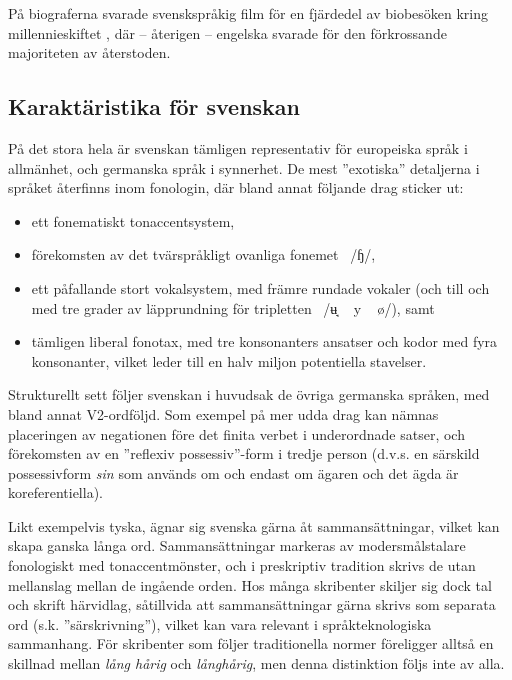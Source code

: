 \begin{multicols}{2}
På biograferna svarade svenskspråkig film för en fjärdedel av
biobesöken kring millennieskiftet \cite[85]{falk2001}, där -- återigen
-- engelska svarade för den förkrossande majoriteten av återstoden.


\subsection{Karaktäristika för svenskan}

På det stora hela är svenskan tämligen representativ för europeiska
språk i allmänhet, och germanska språk i synnerhet. De mest ''exotiska''
detaljerna i språket återfinns inom fonologin, där bland annat
följande drag sticker ut:

\begin{itemize}
\item ett fonematiskt tonaccentsystem,
\item förekomsten av det tvärspråkligt ovanliga
  fonemet~{ /ɧ/},
\item ett påfallande stort vokalsystem, med främre rundade vokaler
  (och till och med tre grader av läpprundning för
  tripletten~{ /ʉ̘ ~ y
    ~ ø/}), samt
\item tämligen liberal fonotax, med tre konsonanters ansatser och
  kodor med fyra konsonanter, vilket leder till en halv miljon
  potentiella stavelser.
\end{itemize}

Strukturellt sett följer svenskan i huvudsak de övriga germanska
språken, med bland annat V2-ordföljd. Som exempel på mer udda drag kan
nämnas placeringen av negationen före det finita verbet i underordnade
satser, och förekomsten av en ''reflexiv possessiv''-form i tredje
person (d.v.s. en särskild possessivform \textit{sin} som används om
och endast om ägaren och det ägda är koreferentiella).


Likt exempelvis tyska, ägnar sig svenska gärna åt sammansättningar,
vilket kan skapa ganska långa ord. Sammansättningar markeras av
modersmålstalare fonologiskt med tonaccent­mönster, och i preskriptiv
tradition skrivs de utan mellanslag mellan de ingående orden. Hos
många skribenter skiljer sig dock tal och skrift härvidlag, såtillvida
att sammansättningar gärna skrivs som separata ord
(s.k. ''särskrivning''), vilket kan vara relevant i språkteknologiska
sammanhang. För skribenter som följer traditionella normer föreligger
alltså en skillnad mellan \textit{lång hårig} och \textit{långhårig},
men denna distinktion följs inte av alla.


\end{multicols}
